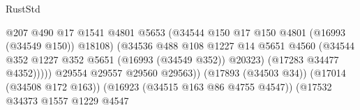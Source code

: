 \begin{lexlean}{RustStd}
\begin{coremodule}
{\begin{coremodule}
{{{{{{{{{{{{{{{{{{{{{{{{{{{{{{{{{{{{{{{{{{{{{{{{{{{{{{{                                                          @207
                                                          @490
                                                          @17
                                                          @1541
                                                          @4801
                                                          @5653
                                                          (@34544
                                                            @150
                                                            @17
                                                            @150
                                                            @4801
                                                            (@16993 (@34549 @150))
                                                            @18108)
                                                          (@34536
                                                            @488
                                                            @108
                                                            @1227
                                                            @14
                                                            @5651
                                                            @4560
                                                            (@34544
                                                              @352
                                                              @1227
                                                              @352
                                                              @5651
                                                              (@16993 (@34549 @352))
                                                              @20323)
                                                            (@17283 @34477 @4352)))))
                                                    @29554
                                                    @29557
                                                    @29560
                                                    @29563))
                                                (@17893 (@34503 @34))
                                                (@17014 (@34508 @172 @163))
                                                (@16923 (@34515 @163 @86 @4755 @4547))
                                                (@17532
                                                  @34373
                                                  @1557
                                                  @1229
                                                  @4547
}}}}}}}}}}}}}}}}}}}}}}}}}}}}}}}}}}}}}}}}}}}}}}}}}}}}}}}
\end{coremodule}}
\end{coremodule}
\end{lexlean}

